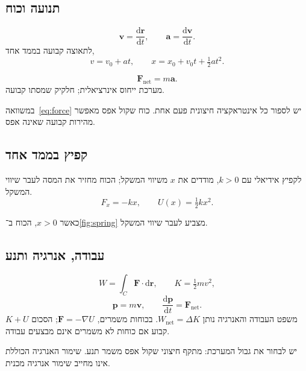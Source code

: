 \begin{referencecolumns}
\begin{referenceentry}
\section{תנועה וכוח}
\[
\mathbf v=\frac{\mathrm d\mathbf r}{\mathrm dt},\qquad
\mathbf a=\frac{\mathrm d\mathbf v}{\mathrm dt}.
\]
לתאוצה קבועה בממד אחד,
\[
v=v_0+at,\qquad x=x_0+v_0t+\tfrac12 at^2.
\]
\begin{referenceformula}
\begin{equation}\label{eq:force}
\mathbf F_{\mathrm{net}}=m\mathbf a.
\end{equation}
מערכת ייחוס אינרציאלית; חלקיק שמסתו קבועה.
\end{referenceformula}
במשוואה~\eqref{eq:force} יש לספור כל אינטראקציה חיצונית פעם אחת.
כוח שקול אפס מאפשר מהירות קבועה שאינה אפס.
\subsection{קפיץ בממד אחד}
לקפיץ אידיאלי עם $k>0$, מודדים את $x$ משיווי המשקל; הכוח מחזיר
את המסה לעבר שיווי המשקל.
\[
F_x=-kx,\qquad U(x)=\tfrac12 kx^2.
\]
\begin{referencefigure}
\begin{tikzpic}
\end{tikzpic}
\end{referencefigure}
כאשר $x>0$, הכוח ב־\autoref{fig:spring} מצביע לעבר שיווי המשקל.
\end{referenceentry}

\begin{referenceentry}
\section{עבודה, אנרגיה ותנע}
\[
W=\int_C\mathbf F\cdot\mathrm d\mathbf r,\qquad K=\tfrac12 mv^2,
\]
\[
\mathbf p=m\mathbf v,\qquad
\frac{\mathrm d\mathbf p}{\mathrm dt}=\mathbf F_{\mathrm{net}}.
\]
משפט העבודה והאנרגיה נותן $W_{\mathrm{net}}=\Delta K$. בכוחות משמרים,
$\mathbf F=-\nabla U$; הסכום $K+U$ קבוע אם כוחות לא משמרים אינם מבצעים עבודה.
\begin{referencenote}[שימור]
יש לבחור את גבול המערכת: מתקף חיצוני שקול אפס משמר תנע.
שימור האנרגיה הכוללת אינו מחייב שימור אנרגיה מכנית.
\end{referencenote}
\end{referenceentry}


\end{referencecolumns}

